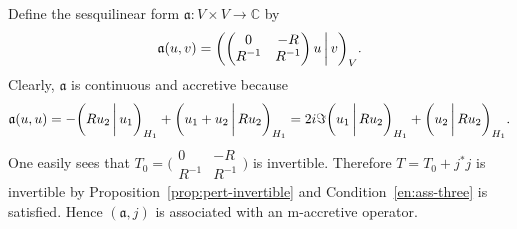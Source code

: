 \documentclass[a4paper,oneside,12pt]{amsart}
\theoremstyle{plain}
\theoremstyle{definition}
\newenvironment{example}
{\pushQED{\qed}

\examplex}
{\popQED\endexamplex}
\begin{document}
\begin{example}
Define the sesquilinear form ${{\mathfrak{{a}}}}\colon V\times V\to{\mathbb{C}}$ by
\[
    {{\mathfrak{{a}}}}(u,v)=\begingroup{{\ifthenelse{\equal{auto}{auto}}{\left({\begin{pmatrix} 0 & -R\\ R^{-1} & R^{-1}\end{pmatrix}u}\mkern3mu{\biggm|}\mkern3mu {v}\right)}{}
\ifthenelse{\equal{auto}{b}}{\bigl({\begin{pmatrix} 0 & -R\\ R^{-1} & R^{-1}\end{pmatrix}u}\mkern3mu{\biggm|}\mkern3mu {v}\bigr)}{}
\ifthenelse{\equal{auto}{B}}{\Bigl({\begin{pmatrix} 0 & -R\\ R^{-1} & R^{-1}\end{pmatrix}u}\mkern3mu{\bigm|}\mkern3mu {v}\Bigr)}{}
}}_V\endgroup.
\]
Clearly, ${{\mathfrak{{a}}}}$ is continuous and accretive because
\[
    {{\mathfrak{{a}}}}(u,u)=-{{\ifthenelse{\equal{auto}{auto}}{\left({Ru_2}\mkern3mu{\biggm|}\mkern3mu {u_1}\right)}{}
\ifthenelse{\equal{auto}{b}}{\bigl({Ru_2}\mkern3mu{\biggm|}\mkern3mu {u_1}\bigr)}{}
\ifthenelse{\equal{auto}{B}}{\Bigl({Ru_2}\mkern3mu{\bigm|}\mkern3mu {u_1}\Bigr)}{}
}}_{H_1} + {{\ifthenelse{\equal{auto}{auto}}{\left({u_1+u_2}\mkern3mu{\biggm|}\mkern3mu {Ru_2}\right)}{}
\ifthenelse{\equal{auto}{b}}{\bigl({u_1+u_2}\mkern3mu{\biggm|}\mkern3mu {Ru_2}\bigr)}{}
\ifthenelse{\equal{auto}{B}}{\Bigl({u_1+u_2}\mkern3mu{\bigm|}\mkern3mu {Ru_2}\Bigr)}{}
}}_{H_1} = 2i\Im{{\ifthenelse{\equal{auto}{auto}}{\left({u_1}\mkern3mu{\biggm|}\mkern3mu {Ru_2}\right)}{}
\ifthenelse{\equal{auto}{b}}{\bigl({u_1}\mkern3mu{\biggm|}\mkern3mu {Ru_2}\bigr)}{}
\ifthenelse{\equal{auto}{B}}{\Bigl({u_1}\mkern3mu{\bigm|}\mkern3mu {Ru_2}\Bigr)}{}
}}_{H_1} + {{\ifthenelse{\equal{auto}{auto}}{\left({u_2}\mkern3mu{\biggm|}\mkern3mu {Ru_2}\right)}{}
\ifthenelse{\equal{auto}{b}}{\bigl({u_2}\mkern3mu{\biggm|}\mkern3mu {Ru_2}\bigr)}{}
\ifthenelse{\equal{auto}{B}}{\Bigl({u_2}\mkern3mu{\bigm|}\mkern3mu {Ru_2}\Bigr)}{}
}}_{H_1}.
\]
One easily sees that $T_0=\bigl(\begin{smallmatrix} 0 & -R\\R^{-1} & R^{-1}\end{smallmatrix}\bigr)$
is invertible. 
Therefore $T=T_0+j^*j$ is invertible by Proposition~\ref{prop:pert-invertible} and Condition~\ref{en:ass-three} is satisfied.
Hence $({{\mathfrak{{a}}}},j)$ is associated with an {\ensuremath{\text{m}}}-accretive operator.


\end{example}
\end{document}
